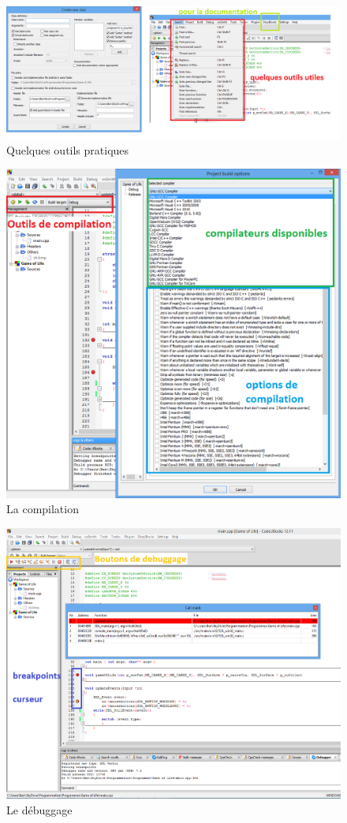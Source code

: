 \documentclass[a4paper, 12pt]{article}
\begin{document}
\begin{doublespace}
\begin{figure}
\includegraphics[scale=0.45]{./images/cb05.png}
\caption{Quelques outils pratiques}				
\label{cb05}				
\end{figure}

\begin{figure}
\includegraphics[scale=0.6]{./images/cb06.png}
\caption{La compilation}				
\label{cb06}				
\end{figure}

\begin{figure}
\includegraphics[scale=0.5]{./images/cb07.png}
\caption{Le débuggage}				
\label{cb07}				
\end{figure}
\end{doublespace}
\end{document}
